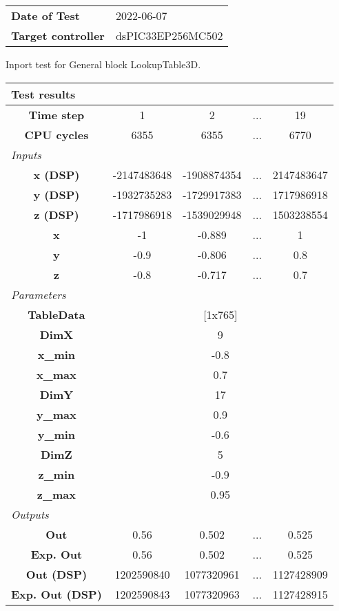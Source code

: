 \begin{tabular}{l l}
\textbf{Date of Test} & 2022-06-07 \tabularnewline
\textbf{Target controller} & dsPIC33EP256MC502 \tabularnewline
\end{tabular}
\vspace{1ex}
Inport test for General block LookupTable3D.

\vspace{1em}
\begin{tabularx}{\textwidth}{|c|c|c|>{\centering\arraybackslash}X|c|}
\hline
\multicolumn{5}{|l|}{\cellcolor[gray]{0.8}\textbf{Test results}} \tabularnewline \hline
\textbf{Time step} & 1 & 2 & ... & 19 \tabularnewline \hline
\textbf{CPU cycles} & 6355 & 6355 & ... & 6770 \tabularnewline \hline
\multicolumn{5}{|l|}{\cellcolor[gray]{0.9}\textit{Inputs}} \tabularnewline \hline
\textbf{x (DSP)} & -2147483648 & -1908874354 & ... & 2147483647 \tabularnewline \hline
\textbf{y (DSP)} & -1932735283 & -1729917383 & ... & 1717986918 \tabularnewline \hline
\textbf{z (DSP)} & -1717986918 & -1539029948 & ... & 1503238554 \tabularnewline \hline
\textbf{x} & -1 & -0.889 & ... & 1 \tabularnewline \hline
\textbf{y} & -0.9 & -0.806 & ... & 0.8 \tabularnewline \hline
\textbf{z} & -0.8 & -0.717 & ... & 0.7 \tabularnewline \hline
\multicolumn{5}{|l|}{\cellcolor[gray]{0.9}\textit{Parameters}} \tabularnewline \hline
\textbf{TableData} & \multicolumn{4}{c|}{[1x765]} \tabularnewline \hline
\textbf{DimX} & \multicolumn{4}{c|}{9} \tabularnewline \hline
\textbf{x\_min} & \multicolumn{4}{c|}{-0.8} \tabularnewline \hline
\textbf{x\_max} & \multicolumn{4}{c|}{0.7} \tabularnewline \hline
\textbf{DimY} & \multicolumn{4}{c|}{17} \tabularnewline \hline
\textbf{y\_max} & \multicolumn{4}{c|}{0.9} \tabularnewline \hline
\textbf{y\_min} & \multicolumn{4}{c|}{-0.6} \tabularnewline \hline
\textbf{DimZ} & \multicolumn{4}{c|}{5} \tabularnewline \hline
\textbf{z\_min} & \multicolumn{4}{c|}{-0.9} \tabularnewline \hline
\textbf{z\_max} & \multicolumn{4}{c|}{0.95} \tabularnewline \hline
\multicolumn{5}{|l|}{\cellcolor[gray]{0.9}\textit{Outputs}} \tabularnewline \hline
\textbf{Out} & 0.56 & 0.502 & ... & 0.525 \tabularnewline \hline
\textbf{Exp. Out} & 0.56 & 0.502 & ... & 0.525 \tabularnewline \hline
\textbf{Out (DSP)} & 1202590840 & 1077320961 & ... & 1127428909 \tabularnewline \hline
\textbf{Exp. Out (DSP)} & 1202590843 & 1077320963 & ... & 1127428915 \tabularnewline \hline
\end{tabularx}
\vspace{1ex}

